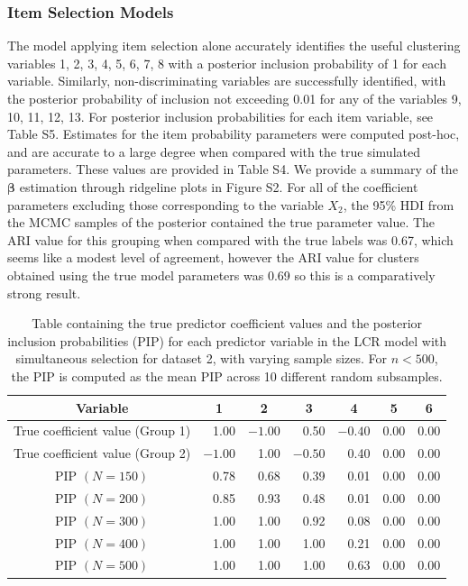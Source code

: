 \documentclass[11pt]{article}
\def\bsbet{\boldsymbol{\beta}}
\theoremstyle{plain}
\theoremstyle{definition}
\begin{document}
\subsubsection{Item Selection Models}
The model applying item selection alone accurately identifies the useful clustering variables 1, 2, 3, 4, 5, 6, 7, 8 with a posterior inclusion probability of 1 for each variable. Similarly, non-discriminating variables are successfully identified, with the posterior probability of inclusion not exceeding 0.01 for any of the variables 9, 10, 11, 12, 13. For posterior inclusion probabilities for each item variable, see Table S5. Estimates for the item probability parameters were computed post-hoc, and are accurate to a large degree when compared with the true simulated parameters. These values are provided in Table S4. We provide a summary of the $\bsbet$ estimation through ridgeline plots in Figure S2. For all of the coefficient parameters excluding those corresponding to the variable $X_2$, the 95\% HDI from the MCMC samples of the posterior contained the true parameter value.
The ARI value for this grouping when compared with the true labels was 0.67, which seems like a modest level of agreement, however the ARI value for clusters obtained using the true model parameters was 0.69 so this is a comparatively strong result. 
\begin{table}
\centering
\begin{tabular}{crrrrrr}
\hline
\multicolumn{1}{c}{Variable} & \multicolumn{1}{c}{1} & \multicolumn{1}{c}{2} & \multicolumn{1}{c}{3} & \multicolumn{1}{c}{4} & \multicolumn{1}{c}{5} & \multicolumn{1}{c}{6} \\
\hline
True coefficient value (Group 1) & 1.00 & $-1.00$ & 0.50 & $-0.40$ & 0.00 & 0.00 \\
True coefficient value (Group 2) & $-1.00$ & 1.00 & $-0.50$ & 0.40 & 0.00 & 0.00 \\
PIP $(N = 150)$ & 0.78 & 0.68 & 0.39 & 0.01 & 0.00 & 0.00 \\
PIP $(N = 200)$ & 0.85 & 0.93 & 0.48 & 0.01 & 0.00 & 0.00 \\
PIP $(N = 300)$ & 1.00 & 1.00 & 0.92 & 0.08 & 0.00 & 0.00 \\
PIP $(N = 400)$ & 1.00 & 1.00 & 1.00 & 0.21 & 0.00 & 0.00 \\
PIP $(N = 500)$ & 1.00 & 1.00 & 1.00 & 0.63 & 0.00 & 0.00 \\
\hline
\end{tabular}
\caption{Table containing the true predictor coefficient values and the posterior inclusion probabilities (PIP) for each predictor variable in the LCR model with simultaneous selection for dataset 2, with varying sample sizes. For $n<500$, the PIP is computed as the mean PIP across 10 different random subsamples.}\label{table:predictor_selection_results_sim_study2}
\end{table}
\end{document}
